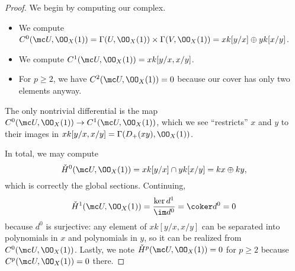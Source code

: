 \documentclass[../notes.tex]{subfiles}
\begin{document}
\begin{proof}
	We begin by computing our complex.
	\begin{itemize}
		\item We compute $C^0(\mc U,\OO_X(1))=\Gamma(U,\OO_X(1))\times\Gamma(V,\OO_X(1))=xk[y/x]\oplus yk[x/y]$.
		\item We compute $C^1(\mc U,\OO_X(1))=xk[y/x,x/y]$.
		\item For $p\ge2$, we have $C^2(\mc U,\OO_X(1))=0$ because our cover has only two elements anyway.
	\end{itemize}
	The only nontrivial differential is the map $C^0(\mc U,\OO_X(1))\to C^1(\mc U,\OO_X(1))$, which we see ``restricts'' $x$ and $y$ to their images in $xk[y/x,x/y]=\Gamma(D_+(xy),\OO_X(1))$.

	In total, we may compute
	\[\check H^0(\mc U,\OO_X(1))=xk[y/x]\cap yk[x/y]=kx\oplus ky,\]
	which is correctly the global sections. Continuing,
	\[\check H^1(\mc U,\OO_X(1))=\frac{\ker d^1}{\im d^0}=\coker d^0=0\]
	because $d^0$ is surjective: any element of $xk[y/x,x/y]$ can be separated into polynomials in $x$ and polynomials in $y$, so it can be realized from $C^0(\mc U,\OO_X(1))$. Lastly, we note $\check H^p(\mc U,\OO_X(1))=0$ for $p\ge2$ because $C^p(\mc U,\OO_X(1))=0$ there.
\end{proof}
\end{document}
